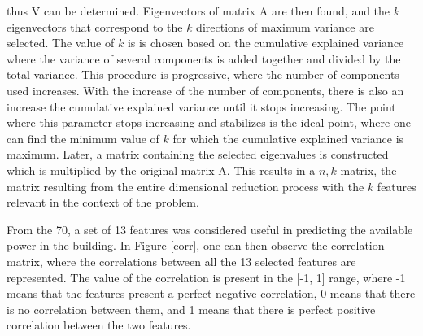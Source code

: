 thus V can be determined. Eigenvectors of matrix A are then found, and the $k$ eigenvectors that correspond to the $k$ directions of maximum variance are selected. The value of $k$ is is chosen based on the cumulative explained variance where the variance of several components is added together and divided by the total variance. This procedure is progressive, where the number of components used increases. With the increase of the number of components, there is also an increase the cumulative explained variance until it stops increasing. The point where this parameter stops increasing and stabilizes is the ideal point, where one can find the minimum value of $k$ for which the cumulative explained variance is maximum. Later, a matrix containing the selected eigenvalues is constructed which is multiplied by the original matrix A. This results in a $n,k$ matrix, the matrix resulting from the entire dimensional reduction process with the $k$ features relevant in the context of the problem.






From the 70, a set of 13 features was considered useful in predicting the available power in the building. In Figure \ref{corr}, one can then observe the correlation matrix, where the correlations between all the 13 selected features are represented. The value of the correlation is present in the [-1, 1] range, where -1 means that the features present a perfect negative correlation, 0 means that there is no correlation between them, and 1 means that there is perfect positive correlation between the two features. 



